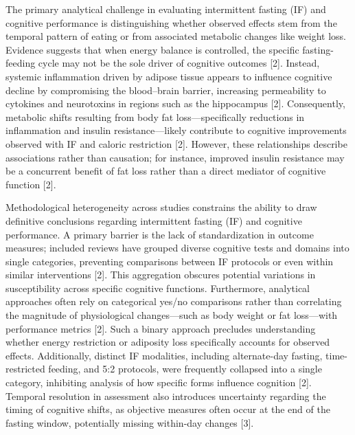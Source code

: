 \documentclass[conference]{IEEEtran}
\begin{document}
The primary analytical challenge in evaluating intermittent fasting (IF) and cognitive performance is distinguishing whether observed effects stem from the temporal pattern of eating or from associated metabolic changes like weight loss. Evidence suggests that when energy balance is controlled, the specific fasting-feeding cycle may not be the sole driver of cognitive outcomes [2]. Instead, systemic inflammation driven by adipose tissue appears to influence cognitive decline by compromising the blood–brain barrier, increasing permeability to cytokines and neurotoxins in regions such as the hippocampus [2]. Consequently, metabolic shifts resulting from body fat loss—specifically reductions in inflammation and insulin resistance—likely contribute to cognitive improvements observed with IF and caloric restriction [2]. However, these relationships describe associations rather than causation; for instance, improved insulin resistance may be a concurrent benefit of fat loss rather than a direct mediator of cognitive function [2].

Methodological heterogeneity across studies constrains the ability to draw definitive conclusions regarding intermittent fasting (IF) and cognitive performance. A primary barrier is the lack of standardization in outcome measures; included reviews have grouped diverse cognitive tests and domains into single categories, preventing comparisons between IF protocols or even within similar interventions [2]. This aggregation obscures potential variations in susceptibility across specific cognitive functions. Furthermore, analytical approaches often rely on categorical yes/no comparisons rather than correlating the magnitude of physiological changes—such as body weight or fat loss—with performance metrics [2]. Such a binary approach precludes understanding whether energy restriction or adiposity loss specifically accounts for observed effects. Additionally, distinct IF modalities, including alternate-day fasting, time-restricted feeding, and 5:2 protocols, were frequently collapsed into a single category, inhibiting analysis of how specific forms influence cognition [2]. Temporal resolution in assessment also introduces uncertainty regarding the timing of cognitive shifts, as objective measures often occur at the end of the fasting window, potentially missing within-day changes [3].
\end{document}
